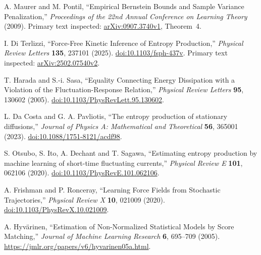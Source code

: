 A. Maurer and M. Pontil,
``Empirical Bernstein Bounds and Sample Variance Penalization,''
\emph{Proceedings of the 22nd Annual Conference on Learning Theory} (2009).
Primary text inspected: \href{https://arxiv.org/abs/0907.3740v1}{arXiv:0907.3740v1},
Theorem~4.

I. Di Terlizzi,
``Force-Free Kinetic Inference of Entropy Production,''
\emph{Physical Review Letters} \textbf{135}, 237101 (2025).
\href{https://doi.org/10.1103/fsph-437v}{doi:10.1103/fsph-437v}.
Primary text inspected: \href{https://arxiv.org/abs/2502.07540v2}{arXiv:2502.07540v2}.

T. Harada and S.-i. Sasa,
``Equality Connecting Energy Dissipation with a Violation of the
Fluctuation-Response Relation,''
\emph{Physical Review Letters} \textbf{95}, 130602 (2005).
\href{https://doi.org/10.1103/PhysRevLett.95.130602}{doi:10.1103/PhysRevLett.95.130602}.

L. Da Costa and G. A. Pavliotis,
``The entropy production of stationary diffusions,''
\emph{Journal of Physics A: Mathematical and Theoretical}
\textbf{56}, 365001 (2023).
\href{https://doi.org/10.1088/1751-8121/acdf98}{doi:10.1088/1751-8121/acdf98}.

S. Otsubo, S. Ito, A. Dechant and T. Sagawa,
``Estimating entropy production by machine learning of short-time fluctuating currents,''
\emph{Physical Review E} \textbf{101}, 062106 (2020).
\href{https://doi.org/10.1103/PhysRevE.101.062106}{doi:10.1103/PhysRevE.101.062106}.

A. Frishman and P. Ronceray,
``Learning Force Fields from Stochastic Trajectories,''
\emph{Physical Review X} \textbf{10}, 021009 (2020).
\href{https://doi.org/10.1103/PhysRevX.10.021009}{doi:10.1103/PhysRevX.10.021009}.

A. Hyv\"arinen,
``Estimation of Non-Normalized Statistical Models by Score Matching,''
\emph{Journal of Machine Learning Research} \textbf{6}, 695--709 (2005).
\url{https://jmlr.org/papers/v6/hyvarinen05a.html}.
